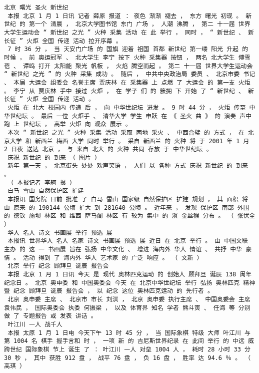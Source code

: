 \documentclass{article}
\begin{document}
\begin{Verbatim}[commandchars=\\\{\}]
 北京 曙光 圣火 新世纪 
 本报 北京 1 月 1 日讯 记者 薛原 报道 ： 夜色 渐渐 褪去 ， 东方 曙光 初现 。 新世纪 的 第一个 清晨 ， 北京大学图书馆 东门 广场 ， 人潮 沸腾 ， 第二 十一届 世界大学生运动会 “ 新世纪 之光 ” 火种 采集 活动 在 此 举行 ， 同时 ， “ 新世纪 、 新长征 ” 火炬 全国 传递 活动 拉开序幕 。 
 7 时 36 分 ， 当 天安门广场 的 国旗 迎着 祖国 首都 新世纪 第一缕 阳光 升起 的 时候 ， 前 奥运冠军 、 北大学生 李宁 按下 火种 采集器 按钮 ， 两名 北大学生 傅雪蓓 、 谭鸣 打开 太阳能 聚光 帆板 ， 火焰 腾空而起 。 第二 十一届 世界大学生运动会 “ 新世纪 之光 ” 的 火种 采集 成功 。 随后 ， 中共中央政治局 委员 、 北京市委 书记 、 本届 大运会 组委会 名誉主席 贾庆林 在 采集器 上 点燃 了 大运会 的 第一支 火炬 。 李宁 从 贾庆林 手中 接过 火炬 ， 在 学子 们 的 簇拥 下 开始 了 “ 新世纪 、 新长征 ” 火炬 全国 传递 活动 。 
 火炬 在 北大 校园内 传递 后 ， 向 中华世纪坛 进发 。 9 时 44 分 ， 火炬 传至 中华世纪坛 。 最后 一位 火炬手 、 清华大学 学生 申跃 在 《 圣火 曲 》 的 演奏 声中 跑 上 世纪坛 ， 高举 火炬 向 观众 展示 。 
 本次 “ 新世纪 之光 ” 火种 采集 活动 采取 两地 采火 、 中西合璧 的 方式 ， 在 北京大学 和 新西兰 梅西 大学 同时 举行 。 采自 新西兰 的 火种 将 于 2001 年 1 月 2 日夜 送达 北京 ， 与 来自 北大 的 火种 共同 存放 于 中华世纪坛 。 
 庆祝 新世纪 的 到来 （ 图片 ） 
 新年 第一天 ， 北京街头 处处 欢声笑语 ， 人们 以 各种 方式 庆祝 新世纪 的 到来 。 
 （ 本报记者 李舸 摄 ） 
 白马 雪山 自然保护区 扩建 
 本报讯 国务院 日前 批准 了 白马 雪山 国家级 自然保护区 扩建 规划 ， 其 面积 将 由 原来 的 190144 公顷 扩大 到 281640 公顷 。 近年来 ， 发现 保护区 南部 外围 的 德钦 施坝 林区 和 维西 萨马阁 林区 有 较为 集中 的 滇 金丝猴 分布 。 （ 张伏全 ） 
 华人 名人 诗文 书画展 举行 预选 展 
 本报讯 世界华人 名人 名家 诗文 书画展 预选 展 近日 在 北京 举行 。 由 中国文联 主办 的 这 一 书画展 旨在 弘扬 中华文化 、 增进 海内外 华人 情谊 、 共抒 中华 豪情 。 活动 得到 了 海内外 华人 艺术家 的 广泛 响应 。 （ 文新 ） 
 北京 举行 纪念 顾拜旦 诞辰 报告会 
 本报 北京 1 月 1 日讯 今天 是 现代 奥林匹克运动 的 创始人 顾拜旦 诞辰 138 周年 纪念日 。 北京 奥申委 和 中国奥委会 今天 在 北京中华世纪坛 举行 弘扬 奥林匹克 精神 暨 纪念 顾拜旦 诞辰 报告会 ， 以 纪念 这位 奥林匹克运动 的 先行者 。 
 北京 奥申委 主席 、 北京市 市长 刘淇 ， 北京 奥申委 执行主席 、 中国奥委会 主席 袁伟民 ， 国际奥委会 执委 何振梁 ， 以及 体育界 知名 学者 熊斗寅 、 任海 等 分别 做 了 专题报告 或 发表 讲话 。 
 叶江川 一人 战千人 
 本报 太原 1 月 1 日电 今天下午 13 时 45 分 ， 当 国际象棋 特级 大师 叶江川 与 第 1004 名 棋手 握手言和 时 ， 一项 新 的 吉尼斯世界纪录 在 此间 举行 的 中远 威 跨世纪 国际象棋 节上 诞生 了 ： 叶江川 一人 对垒 1004 人 ， 耗时 28 小时 33 分 30 秒 ， 其中 获胜 912 盘 ， 战平 76 盘 ， 负 16 盘 ， 胜率 达 94.6 ％ 。 （ 高琪 ） 

\end{Verbatim}
\end{document}
